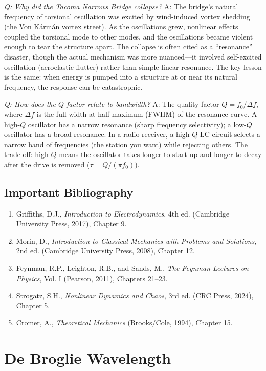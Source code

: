 \documentclass[11pt,openright]{book}
\begin{document}
\textit{Q: Why did the Tacoma Narrows Bridge collapse?}
A: The bridge's natural frequency of torsional oscillation was excited by wind-induced vortex shedding (the Von K\'{a}rm\'{a}n vortex street). As the oscillations grew, nonlinear effects coupled the torsional mode to other modes, and the oscillations became violent enough to tear the structure apart. The collapse is often cited as a ``resonance'' disaster, though the actual mechanism was more nuanced---it involved self-excited oscillation (aeroelastic flutter) rather than simple linear resonance. The key lesson is the same: when energy is pumped into a structure at or near its natural frequency, the response can be catastrophic.

\textit{Q: How does the $Q$ factor relate to bandwidth?}
A: The quality factor $Q = f_0/\Delta f$, where $\Delta f$ is the full width at half-maximum (FWHM) of the resonance curve. A high-$Q$ oscillator has a narrow resonance (sharp frequency selectivity); a low-$Q$ oscillator has a broad resonance. In a radio receiver, a high-$Q$ LC circuit selects a narrow band of frequencies (the station you want) while rejecting others. The trade-off: high $Q$ means the oscillator takes longer to start up and longer to decay after the drive is removed ($\tau = Q/(\pi f_0)$).
\section*{Important Bibliography}
\begin{enumerate}
\item Griffiths, D.J., \textit{Introduction to Electrodynamics}, 4th ed. (Cambridge University Press, 2017), Chapter 9.
\item Morin, D., \textit{Introduction to Classical Mechanics with Problems and Solutions}, 2nd ed. (Cambridge University Press, 2008), Chapter 12.
\item Feynman, R.P., Leighton, R.B., and Sands, M., \textit{The Feynman Lectures on Physics}, Vol. I (Pearson, 2011), Chapters 21--23.
\item Strogatz, S.H., \textit{Nonlinear Dynamics and Chaos}, 3rd ed. (CRC Press, 2024), Chapter 5.
\item Cromer, A., \textit{Theoretical Mechanics} (Brooks/Cole, 1994), Chapter 15.
\end{enumerate}


\chapter{De Broglie Wavelength}
\end{document}
